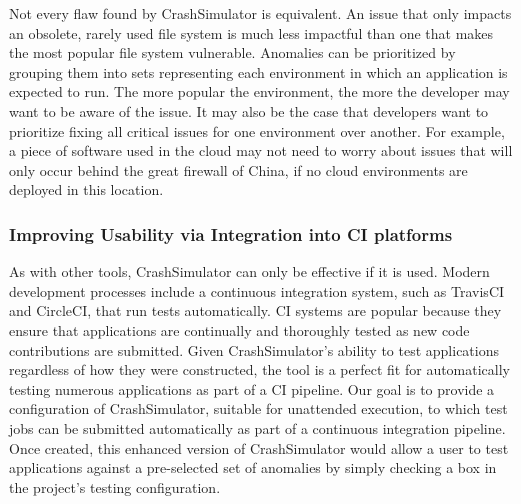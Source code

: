 Not every flaw found by CrashSimulator is equivalent.  An issue that only
impacts an obsolete, rarely used file system is much less impactful than
one that makes the most popular file system vulnerable.
Anomalies
can be prioritized by grouping them into sets representing each
environment in which an application is expected to run. The more popular
the environment, the more the developer may want to be aware of the issue.
It may also be the case that developers want to prioritize fixing all
critical issues for one environment over another.  For example, a piece
of software used in the cloud may not need to worry about issues that will only
occur behind the great firewall of China, if no cloud environments are deployed in this location.


%
%

\subsubsection{Improving Usability via Integration into CI platforms}

As with other tools, CrashSimulator can only be effective if it is used.
Modern development processes include a continuous integration system,
such as TravisCI
and CircleCI, that run tests automatically.
CI systems are popular because they
ensure that applications are continually and thoroughly tested as new code
contributions are submitted.  Given CrashSimulator's ability to test
applications regardless of how they were constructed,
the tool is a perfect fit for
automatically testing numerous applications as part of a CI pipeline.
Our goal is to provide a configuration of CrashSimulator,
suitable for unattended execution, to which test jobs can be submitted
automatically as part of a continuous integration pipeline.  Once created,
this enhanced version of CrashSimulator would allow a user to test
applications against
a pre-selected set of anomalies by simply checking a box in the project's
testing configuration.

